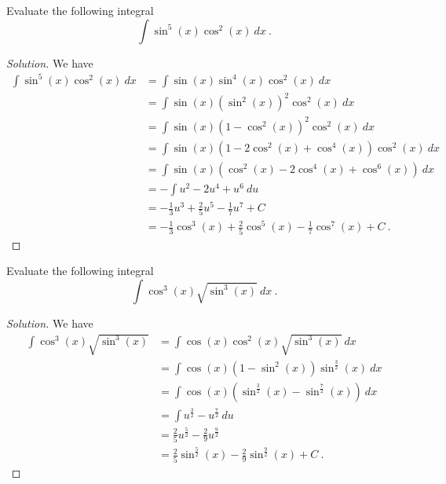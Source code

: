 \documentclass[compacto,10pt,comentarios]{aleph-notas}
\begin{document}
\begin{ejer}
    Evaluate the following integral
    $$
        \int \sin^{5}(x) \cos^{2}(x) ~ dx ~ .
    $$
\end{ejer}
\begin{proof}[Solution]
    We have
    \begin{align*}
        \int \sin^{5}(x) \cos^{2}(x) ~ dx 
        & = \int \sin(x) \sin^{4}(x) \cos^{2}(x) ~ dx \\
        & = \int \sin(x) (\sin^{2}(x))^{2} \cos^{2}(x) ~ dx \\
        & = \int \sin(x) (1 - \cos^{2}(x))^{2} \cos^{2}(x) ~ dx \\
        & = \int \sin(x) (1 - 2\cos^{2}(x) + \cos^{4}(x)) \cos^{2}(x) ~ dx \\
        & = \int \sin(x) (\cos^{2}(x) - 2\cos^{4}(x) + \cos^{6}(x)) ~ dx \\
        & = - \int u^{2} - 2 u^{4} + u^{6} ~ du \tag*{by letting $u = \cos(x)$} \\
        & = - \frac{1}{3} u ^{3} + \frac{2}{5} u^{5} - \frac{1}{7}u^{7} + C \\
        & = - \frac{1}{3} \cos^{3}(x) + \frac{2}{5} \cos^{5}(x) - \frac{1}{7}\cos^{7}(x) + C ~ .
    \end{align*}
\end{proof}

\begin{ejer}
    Evaluate the following integral
    $$
        \int \cos^{3}(x)\sqrt{\sin^{3}(x)} ~ dx ~ .
    $$
\end{ejer}
\begin{proof}[Solution]
    We have
    \begin{align*}
        \int \cos^{3}(x)\sqrt{\sin^{3}(x)} 
        & = \int \cos(x) \cos^{2}(x) \sqrt{\sin^{3}(x)} ~ dx \\
        & = \int \cos(x) \left( 1 - \sin^{2}(x) \right) \sin^{\frac{3}{2}}(x) ~ dx \\
        & = \int \cos(x) \left( \sin^{\frac{3}{2}}(x) - \sin^{\frac{7}{2}}(x) \right) ~ dx \\
        & = \int u^{\frac{3}{2}} - u^{\frac{7}{2}} ~ du \tag*{by letting $u = \sin(x)$} \\
        & = \frac{2}{5} u ^{\frac{5}{2}} - \frac{2}{9} u ^{\frac{9}{2}} \\
        & = \frac{2}{5} \sin^{\frac{5}{2}}(x) - \frac{2}{9}  \sin^{\frac{9}{2}}(x) + C ~ .
    \end{align*}
\end{proof}
\end{document}
